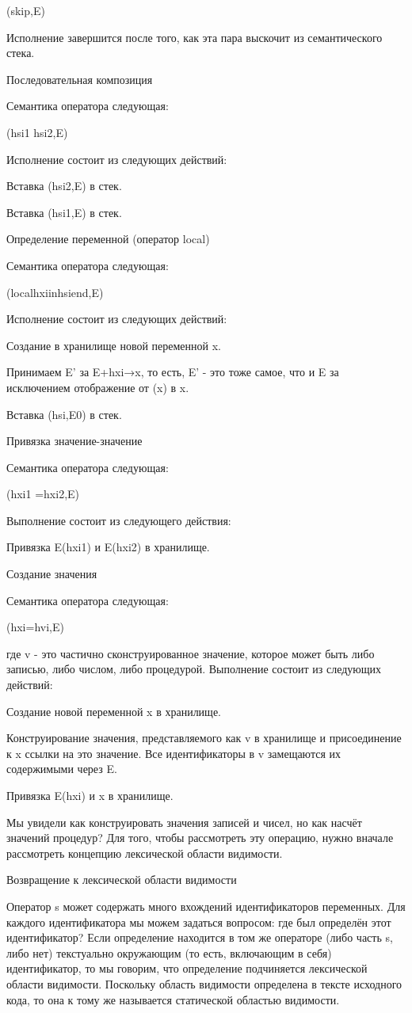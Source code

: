 (skip,E)

Исполнение завершится после того, как эта пара выскочит из семантического стека.

Последовательная композиция

Семантика оператора следующая:

(hsi1 hsi2,E)

Исполнение состоит из следующих действий:

Вставка (hsi2,E) в стек.

Вставка (hsi1,E) в стек.

Определение переменной (оператор local)

Семантика оператора следующая:

(localhxiinhsiend,E)

Исполнение состоит из следующих действий:

Создание в хранилище новой переменной x.

Принимаем E' за E+{hxi→x}, то есть, E' - это тоже самое, что и E за исключением отображение от (x) в x.

Вставка (hsi,E0) в стек.

Привязка значение-значение

Семантика оператора следующая:

(hxi1 =hxi2,E)

Выполнение состоит из следующего действия:

Привязка E(hxi1) и E(hxi2) в хранилище.

Создание значения

Семантика оператора следующая:

(hxi=hvi,E)

где v - это частично сконструированное значение, которое может быть либо записью, либо числом, либо процедурой. Выполнение состоит из следующих действий:

Создание новой переменной x в хранилище.

Конструирование значения, представляемого как v в хранилище и присоединение к x ссылки на это значение. Все идентификаторы в v замещаются их содержимыми через E.

Привязка E(hxi) и x в хранилище.

Мы увидели как конструировать значения записей и чисел, но как насчёт значений процедур? Для того, чтобы рассмотреть эту операцию, нужно вначале рассмотреть концепцию лексической области видимости.

Возвращение к лексической области видимости

Оператор s может содержать много вхождений идентификаторов переменных. Для каждого идентификатора мы можем задаться вопросом: где был определён этот идентификатор? Если определение находится в том же операторе (либо часть s, либо нет) текстуально окружающим (то есть, включающим в себя) идентификатор, то мы говорим, что определение подчиняется лексической области видимости. Поскольку область видимости определена в тексте исходного кода, то она к тому же называется статической областью видимости.

